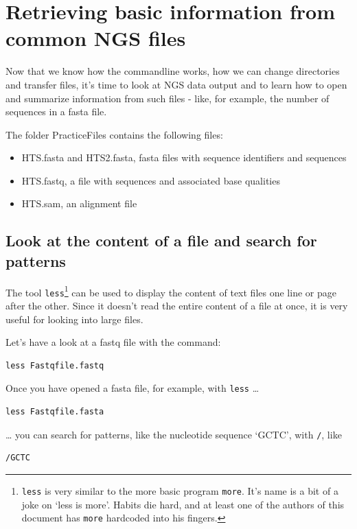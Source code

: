 \documentclass[11pt]{article}
\begin{document}
\section{Retrieving basic information from common NGS files}
\label{sec-4}

 
Now that we know how the commandline works, how we can change
directories and transfer files, it's time to look at NGS data output
and to learn how to open and summarize information from such files -
like, for example, the number of sequences in a fasta file.

The folder PracticeFiles contains the following files:
\begin{itemize}
\item HTS.fasta and HTS2.fasta, fasta files with sequence identifiers and sequences
\item HTS.fastq, a file with sequences and associated base qualities
\item HTS.sam, an alignment file
\end{itemize}
\subsection{Look at the content of a file and search for patterns}
\label{sec-4-1}

The tool \texttt{less}\footnote{\texttt{less} is very similar to the more basic program \texttt{more}. It's name is
a bit of a joke on `less is more'. Habits die hard, and at least one of the
authors of this document has \texttt{more} hardcoded into his fingers.
 } can be used to display the content of text files one
line or page after the other. Since it doesn't read the entire content
of a file at once, it is very useful for looking into large files.

Let's have a look at a fastq file with the command:


\begin{verbatim}
less Fastqfile.fastq
\end{verbatim}

Once you have opened a fasta file, for example, with \texttt{less} \ldots{}


\begin{verbatim}
less Fastqfile.fasta
\end{verbatim}

\ldots{} you can search for patterns, like the nucleotide sequence `GCTC', with \texttt{/}, like


\begin{verbatim}
/GCTC
\end{verbatim}
\end{document}
